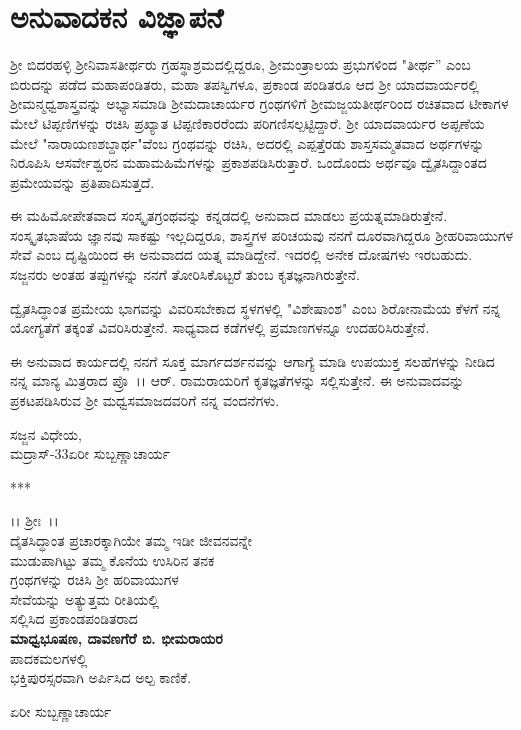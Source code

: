 
\chapter*{ಅನುವಾದಕನ ವಿಜ್ಞಾಪನೆ}

 ಶ‍್ರೀ ಬಿದರಹಳ್ಳಿ ಶ‍್ರೀನಿವಾಸತೀರ್ಥರು ಗ್ರಹಸ್ಥಾಶ್ರಮದಲ್ಲಿದ್ದರೂ, ಶ‍್ರೀಮಂತ್ರಾಲಯ ಪ್ರಭು\-ಗಳಿಂದ "ತೀರ್ಥ'' ಎಂಬ ಬಿರುದನ್ನು ಪಡೆದ ಮಹಾಪಂಡಿತರು, ಮಹಾ ತಪಸ್ವಿ\-ಗಳೂ, ಪ್ರಕಾಂಡ ಪಂಡಿತರೂ ಆದ ಶ‍್ರೀ ಯಾದವಾರ್ಯರಲ್ಲಿ ಶ‍್ರೀಮನ್ಮಧ್ವಶಾಸ್ತ್ರವನ್ನು ಅಭ್ಯಾಸ\-ಮಾಡಿ ಶ‍್ರೀಮದಾಚಾರ್ಯರ ಗ್ರಂಥಗಳಿಗೆ ಶ‍್ರೀಮಜ್ಜಯತೀರ್ಥರಿಂದ ರಚಿತವಾದ ಟೀಕಾ\-ಗಳ ಮೇಲೆ ಟಿಪ್ಪಣಿಗಳನ್ನು ರಚಿಸಿ ಪ್ರಖ್ಯಾತ ಟಿಪ್ಪಣಿಕಾರರೆಂದು ಪರಿಗಣಿಸಲ್ಪಟ್ಟಿದ್ದಾರೆ. ಶ‍್ರೀ ಯಾದವಾರ್ಯರ ಅಪ್ಪಣೆಯ ಮೇಲೆ "ನಾರಾಯಣಶಬ್ದಾರ್ಥ"ವೆಂಬ ಗ್ರಂಥವನ್ನು ರಚಿಸಿ, ಅದರಲ್ಲಿ ಎಪ್ಪತ್ತೆರಡು ಶಾಸ್ತಸಮ್ಮತವಾದ ಅರ್ಥಗಳನ್ನು ನಿರೂಪಿಸಿ ಆ\break ಸರ್ವೇಶ್ವರನ ಮಹಾಮಹಿಮೆಗಳನ್ನು ಪ್ರಕಾಶಪಡಿಸಿರುತ್ತಾರೆ. ಒಂದೊಂದು ಅರ್ಥವೂ ದ್ವೈತ\-ಸಿದ್ದಾಂತದ ಪ್ರಮೇಯವನ್ನು ಪ್ರತಿಪಾದಿಸುತ್ತದೆ.

ಈ ಮಹಿಮೋಪೇತವಾದ ಸಂಸ್ಕೃತಗ್ರಂಥವನ್ನು ಕನ್ನಡದಲ್ಲಿ ಅನುವಾದ ಮಾಡಲು ಪ್ರಯತ್ನ\-ಮಾಡಿರುತ್ತೇನೆ. ಸಂಸ್ಕೃತಭಾಷೆಯ ಜ್ಞಾನವು ಸಾಕಷ್ಟು ಇಲ್ಲದಿದ್ದರೂ, ಶಾಸ್ತ್ರಗಳ ಪರಿ\-ಚಯವು ನನಗೆ ದೂರವಾಗಿದ್ದರೂ ಶ‍್ರೀಹರಿವಾಯುಗಳ ಸೇವೆ ಎಂಬ ದೃಷ್ಟಿಯಿಂದ ಈ ಅನುವಾದದ ಯತ್ನ ಮಾಡಿದ್ದೇನೆ. ಇದರಲ್ಲಿ ಅನೇಕ ದೋಷಗಳು ಇರಬಹುದು. ಸಜ್ಜನರು ಅಂತಹ ತಪ್ಪುಗಳನ್ನು ನನಗೆ ತೋರಿಸಿಕೊಟ್ಟರೆ ತುಂಬ ಕೃತಜ್ಞನಾಗಿರುತ್ತೇನೆ.

ದ್ವೈತಸಿದ್ಧಾಂತ ಪ್ರಮೇಯ ಭಾಗವನ್ನು ವಿವರಿಸಬೇಕಾದ ಸ್ಥಳಗಳಲ್ಲಿ "ವಿಶೇಷಾಂಶ" ಎಂಬ ಶಿರೋನಾಮೆಯ ಕೆಳಗೆ ನನ್ನ ಯೋಗ್ಯತೆಗೆ ತಕ್ಕಂತೆ ವಿವರಿಸಿರುತ್ತೇನೆ. ಸಾಧ್ಯವಾದ ಕಡೆ\-ಗಳಲ್ಲಿ ಪ್ರಮಾಣಗಳನ್ನೂ ಉದಹರಿಸಿರುತ್ತೇನೆ.

\newpage

ಈ ಅನುವಾದ ಕಾರ್ಯದಲ್ಲಿ ನನಗೆ ಸೂಕ್ತ ಮಾರ್ಗದರ್ಶನವನ್ನು ಆಗಾಗ್ಯೆ ಮಾಡಿ ಉಪಯುಕ್ತ ಸಲಹೆಗಳನ್ನು ನೀಡಿದ ನನ್ನ ಮಾನ್ಯ ಮಿತ್ರರಾದ ಪ್ರೊ~।। ಆರ್. ರಾಮರಾಯರಿಗೆ ಕೃತ\-ಜ್ಞತೆಗಳನ್ನು ಸಲ್ಲಿಸುತ್ತೇನೆ. ಈ ಅನುವಾದವನ್ನು ಪ್ರಕಟಪಡಿಸಿರುವ ಶ‍್ರೀ ಮಧ್ವಸಮಾಜ\-ದವರಿಗೆ ನನ್ನ ವಂದನೆಗಳು.

\vskip 1cm

\begin{flushleft}
\hfill ಸಜ್ಜನ ವಿಧೇಯ,\\ಮದ್ರಾಸ್-33\hfill ಏರೀ ಸುಬ್ಬಣ್ಣಾಚಾರ್ಯ
\end{flushleft}

\begin{center}
***
\end{center}

\newpage

\vfill

\begin{center}
।। ಶ‍್ರೀಃ~।।\\ ದೈತಸಿದ್ಧಾಂತ ಪ್ರಚಾರಕ್ಕಾಗಿಯೇ ತಮ್ಮ ಇಡೀ ಜೀವನವನ್ನೇ\\ ಮುಡುಪಾಗಿಟ್ಟು ತಮ್ಮ ಕೊನೆಯ ಉಸಿರಿನ ತನಕ\\ ಗ್ರಂಥಗಳನ್ನು ರಚಿಸಿ ಶ‍್ರೀ ಹರಿವಾಯುಗಳ\\ ಸೇವೆಯನ್ನು ಅತ್ಯುತ್ತಮ ರೀತಿಯಲ್ಲಿ\\ ಸಲ್ಲಿಸಿದ ಪ್ರಕಾಂಡಪಂಡಿತರಾದ\\\textbf{ಮಾಧ್ವಭೂಷಣ, ದಾವಣಗೆರೆ ಬಿ. ಭೀಮರಾಯರ}\\ ಪಾದಕಮಲಗಳಲ್ಲಿ\\ ಭಕ್ತಿಪುರಸ್ಸರವಾಗಿ ಅರ್ಪಿಸಿದ ಅಲ್ಪ ಕಾಣಿಕೆ.
\end{center}

\begin{flushright}
ಏರೀ ಸುಬ್ಬಣ್ಣಾಚಾರ್ಯ
\end{flushright}

